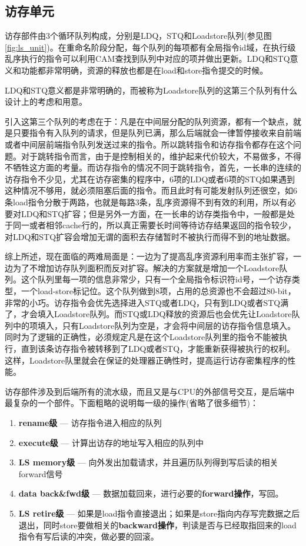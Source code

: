 \subsection{访存单元}\label{subsec:ls_unit}

访存部件由3个循环队列构成，分别是LDQ，STQ和Loadstore队列(参见图\ref{fig:ls_unit})。在重命名阶段分配，每个队列的每项都有全局指令id域，在执行级乱序执行的指令可以利用CAM查找到队列中对应的项并做出更新。LDQ和STQ意义和功能都非常明确，资源的释放也都是在load和store指令提交的时候。

LDQ和STQ意义都是非常明确的，而被称为Loadstore队列的这第三个队列有什么设计上的考虑和用意。

引入这第三个队列的考虑在于：凡是在中间层分配的队列资源，都有一个缺点，就是只要指令有入队列的请求，但是队列已满，那么后端就会一律暂停接收来自前端或者中间层前端指令队列发送过来的指令。所以跳转指令和访存指令都存在这个问题。对于跳转指令而言，由于是控制相关的，维护起来代价较大，不易做多，不得不牺牲这方面的考量。而访存指令的情况不同于跳转指令，首先，一长串的连续的访存指令不少见，尤其在访存密集的程序中，6项的LDQ或者6项的STQ如果遇到这种情况不够用，就必须阻塞后面的指令。而且此时有可能发射队列还很空，如6条load指令分散于两路，也就是每路3条，乱序资源得不到有效的利用，所以有必要对LDQ和STQ扩容；但是另外一方面，在一长串的访存类指令中，一般都是处于同一或者相邻cache行的，所以真正需要长时间等待访存结果返回的指令较少，对LDQ和STQ扩容会增加无谓的面积去存储暂时不被执行而得不到的地址数据。

综上所述，现在面临的两难局面是：一边为了提高乱序资源利用率而主张扩容，一边为了不增加访存队列面积而反对扩容。解决的方案就是增加一个Loadstore队列。这个队列里每一项的信息非常少，只有一个全局指令标识符id号，一个访存类型，一个load-store标记位。这个队列做到8项，占用的总资源也不会超过80-bit，非常的小巧。访存指令会优先选择进入STQ或者LDQ，只有到LDQ或者STQ满了，才会填入Loadstore队列。而STQ或LDQ释放的资源后也会优先让Loadstore队列中的项填入，只有Loadstore队列为空是，才会将中间层的访存指令信息填入。同时为了逻辑的正确性，必须规定凡是在这个Loadstore队列里的指令不能被执行，直到该条访存指令被转移到了LDQ或者STQ，才能重新获得被执行的权利。这样，Loadstore队里就会在保证的处理器正确性时，提高运行访存密集程序的性能。

访存部件涉及到后端所有的流水级，而且又是与CPU的外部信号交互，是后端中最复杂的一个部件。下面粗略的说明每一级的操作(省略了很多细节)：
\begin{enumerate}[label=(\alph*)]
	\item \textbf{rename级} --- 访存指令进入相应的队列
	\item \textbf{execute级} --- 计算出访存的地址写入相应的队列中
	\item \textbf{LS memory级} --- 向外发出加载请求，并且遍历队列得到写后读的相关forward信号
	\item \textbf{data back\&fwd级} --- 数据加载回来，进行必要的\textbf{forward操作}，写回。
	\item \textbf{LS retire级} --- 如果是load指令直接退出；如果是store指向内存写完数据之后退出，同时store要做相关的\textbf{backward操作}，判读是否与已经取指回来的load指令有写后读的冲突，做必要的回滚。
\end{enumerate}

